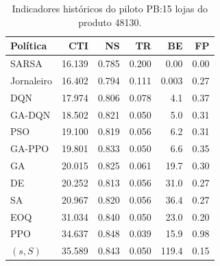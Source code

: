 \begin{table}[htbp]\centering\small
\caption{Indicadores históricos do piloto PB:15 lojas do produto 48130.}\label{tab:global_prelim}
\begin{tabular}{@{}lrrrrr@{}}\toprule
Política & CTI & NS & TR & BE & FP\\\midrule
SARSA &16.139&0.785&0.200&0.00&0.00\\
Jornaleiro &16.402&0.794&0.111&0.003&0.27\\
DQN &17.974&0.806&0.078&4.1&0.37\\
GA-DQN &18.502&0.821&0.050&5.0&0.31\\
PSO &19.100&0.819&0.056&6.2&0.31\\
GA-PPO &19.801&0.833&0.050&6.6&0.35\\
GA &20.015&0.825&0.061&19.7&0.30\\
DE &20.252&0.813&0.056&31.0&0.27\\
SA &20.967&0.820&0.056&36.4&0.27\\
EOQ &31.034&0.840&0.050&23.0&0.20\\
PPO &34.637&0.848&0.039&15.9&0.98\\
$(s,S)$ &35.589&0.843&0.050&119.4&0.15\\
\bottomrule\end{tabular}\end{table}
